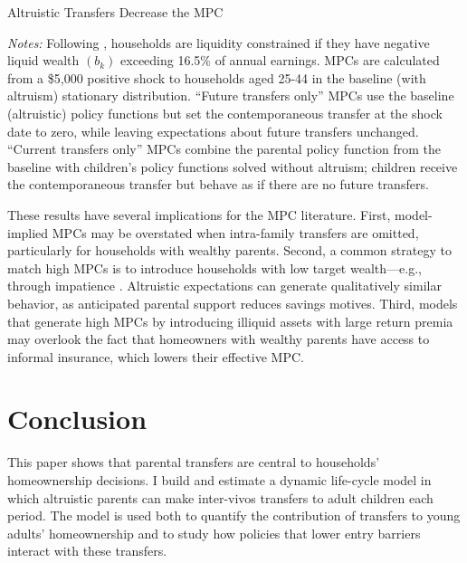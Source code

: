 \documentclass[12pt]{article}
\begin{document}
\begin{table}[tb]
	\center\singlespacing	
	\begin{threeparttable}[tb]
		\caption{Altruistic Transfers Decrease the MPC}
		
	\end{threeparttable}
	{\begin{footnotesize}\begin{flushleft}\vspace{-0.1in}
		\textit{Notes:} Following \cite{Kaplan2014}, households are liquidity constrained if they have negative liquid wealth $(b_k)$ exceeding 16.5\% of annual earnings. MPCs are calculated from a \$5,000 positive shock to households aged 25-44 in the baseline (with altruism) stationary distribution. ``Future transfers only'' MPCs use the baseline (altruistic) policy functions but set the contemporaneous transfer at the shock date to zero, while leaving expectations about future transfers unchanged. ``Current transfers only'' MPCs combine the parental policy function from the baseline with children’s policy functions solved without altruism; children receive the contemporaneous transfer but behave as if there are no future transfers. \end{flushleft}\end{footnotesize}}			
\end{table}

These results have several implications for the MPC literature. First, model-implied MPCs may be overstated when intra-family transfers are omitted, particularly for households with wealthy parents. Second, a common strategy to match high MPCs is to introduce households with low target wealth---e.g., through impatience \citep{aguiar2024hand}. Altruistic expectations can generate qualitatively similar behavior, as anticipated parental support reduces savings motives. Third, models that generate high MPCs by introducing illiquid assets with large return premia \citep{kaplan2022marginal} may overlook the fact that homeowners with wealthy parents have access to informal insurance, which lowers their effective MPC. 

\section{Conclusion}
This paper shows that parental transfers are central to households’ homeownership decisions. I build and estimate a dynamic life-cycle model in which altruistic parents can make inter-vivos transfers to adult children each period. The model is used both to quantify the contribution of transfers to young adults’ homeownership and to study how policies that lower entry barriers interact with these transfers.
\end{document}
